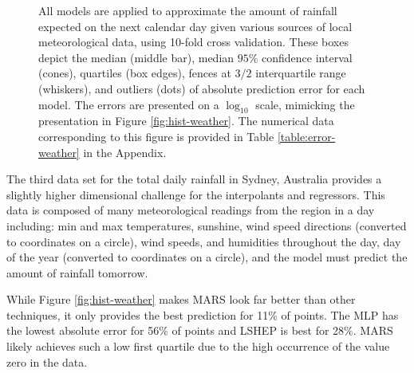 \documentclass[smallextended,final]{svjour3}       %
\begin{document}
\begin{figure}
  \centering
  \caption{All models are applied to approximate the amount of rainfall
  expected on the next calendar day given various sources of local
  meteorological data, using 10-fold cross validation.
  These boxes depict the median (middle bar), median $95\%$ confidence
  interval (cones), quartiles (box edges), fences at $3/2$ interquartile
  range (whiskers), and outliers (dots) of absolute prediction error for
  each model. The errors are presented on a $\log_{10}$ scale, mimicking
  the presentation in Figure \ref{fig:hist-weather}. The 
  numerical data corresponding to this figure is provided in Table
  \ref{table:error-weather} in the Appendix.}
\label{fig:error-weather}
\end{figure}

The third data set for the total daily rainfall in Sydney, Australia
\cite{williams2009rattle} provides a slightly higher dimensional challenge
for the interpolants and regressors. This data is composed of many
meteorological readings from the region in a day including: min and max
temperatures, sunshine, wind speed directions (converted to coordinates
on a circle), wind speeds, and humidities throughout the day, day of the
year (converted to coordinates on a circle), and the model must predict the
amount of rainfall tomorrow.

While Figure \ref{fig:hist-weather} makes MARS look far better than other
techniques, it only provides the best prediction for 11\% of points. The
MLP has the lowest absolute error for 56\% of points and LSHEP is best for
28\%.  MARS likely achieves such a low first quartile due to the high
occurrence of the value zero in the data.
\end{document}
